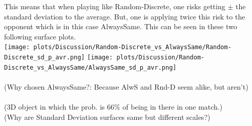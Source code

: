 \documentclass{article}
\begin{document}
\begin{itemize}
		This means that when playing like Random-Discrete, one risks getting $\pm$ the standard deviation to the average.
		But, one is applying twice this risk to the opponent which is in this case AlwaysSame.
		This can be seen in these two following surface plots.\\
		\texttt{[image: plots/Discussion/Random-Discrete\_vs\_AlwaysSame/Random-Discrete\_sd\_p\_avr.png]}
		\texttt{[image: plots/Discussion/Random-Discrete\_vs\_AlwaysSame/AlwaysSame\_sd\_p\_avr.png]}\\
		\\(Why chosen AlwaysSame?: Because AlwS and Rnd-D seem alike, but aren't)\\
		\\(3D object in which the prob. is 66\% of being in there in one match.)
		\\(Why are Standard Deviation surfaces same but different scales?)


\end{itemize}
\end{document}
